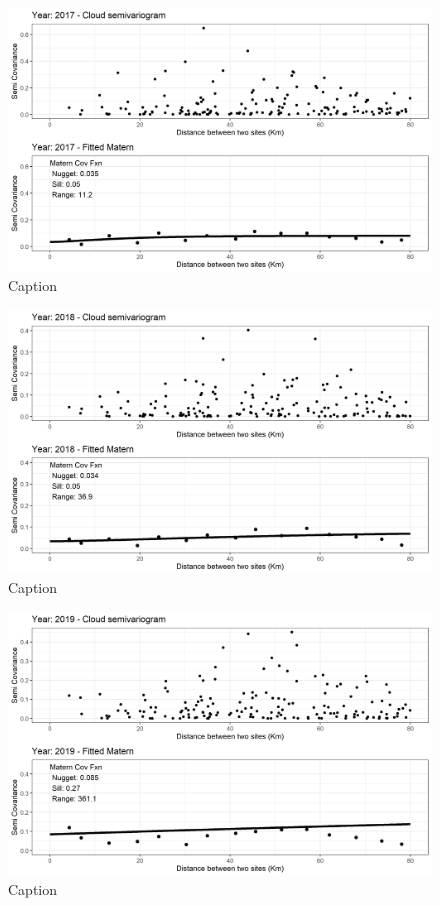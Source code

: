 \begin{figure}
    \centering
    \includegraphics{Figures/EmpiricalVariograms/Empirical_Variogram_2017.png}
    \caption{Caption}
    \label{fig:my_label}
\end{figure}

\begin{figure}
    \centering
    \includegraphics{Figures/EmpiricalVariograms/Empirical_Variogram_2018.png}
    \caption{Caption}
    \label{fig:my_label}
\end{figure}

\begin{figure}
    \centering
    \includegraphics{Figures/EmpiricalVariograms/Empirical_Variogram_2019.png}
    \caption{Caption}
    \label{fig:my_label}
\end{figure}